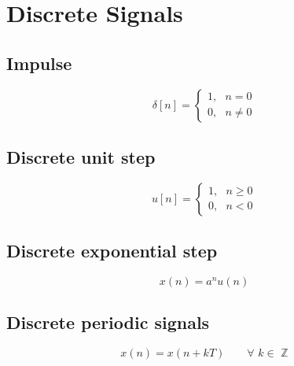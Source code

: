 
\section{Discrete Signals}
\subsection{Impulse}
    $$
    \delta[n]=\begin{cases}
        1,\text{ $n=0$}\\
        0,\text{ $n\neq0$}
    \end{cases}
    $$

\subsection{Discrete unit step}
    $$
    u[n]=\begin{cases}
        1,\text{ $n\geq0$}\\
        0,\text{ $n<0$}
    \end{cases}
    $$

\subsection{Discrete exponential step}
    $$
    x(n)=a^nu(n)
    $$

\subsection{Discrete periodic signals}
    $$
    x(n)=x(n+kT)\qquad\forall\,\,k\in\,\,\mathbb{Z}
    $$

